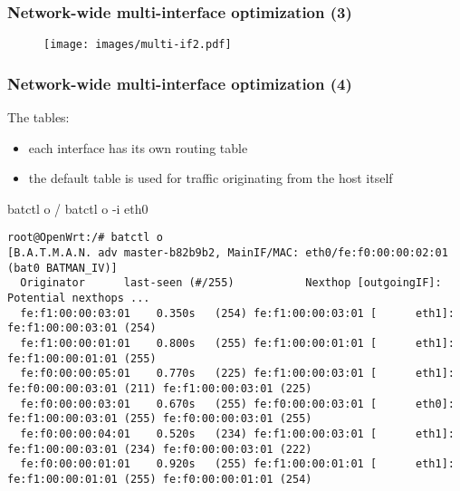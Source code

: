 \documentclass[slidestop]{beamer}
\begin{document}
\begin{frame}[c]
	\frametitle{Network-wide multi-interface optimization (3)}

	\begin{figure}
		\centering
		\texttt{[image: images/multi-if2.pdf]}
	\end{figure}
\end{frame}

\begin{frame}[c,fragile]
	\frametitle{Network-wide multi-interface optimization (4)}

	The tables:

	\begin{itemize}
		\item each interface has its own routing table
		\item the default table is used for traffic originating from the host itself
	\end{itemize}

	batctl o / batctl o -i eth0
	\begin{lstlisting}[basicstyle=\tiny]
root@OpenWrt:/# batctl o
[B.A.T.M.A.N. adv master-b82b9b2, MainIF/MAC: eth0/fe:f0:00:00:02:01 (bat0 BATMAN_IV)]
  Originator      last-seen (#/255)           Nexthop [outgoingIF]:   Potential nexthops ...
  fe:f1:00:00:03:01    0.350s   (254) fe:f1:00:00:03:01 [      eth1]: fe:f1:00:00:03:01 (254)
  fe:f1:00:00:01:01    0.800s   (255) fe:f1:00:00:01:01 [      eth1]: fe:f1:00:00:01:01 (255)
  fe:f0:00:00:05:01    0.770s   (225) fe:f1:00:00:03:01 [      eth1]: fe:f0:00:00:03:01 (211) fe:f1:00:00:03:01 (225)
  fe:f0:00:00:03:01    0.670s   (255) fe:f0:00:00:03:01 [      eth0]: fe:f1:00:00:03:01 (255) fe:f0:00:00:03:01 (255)
  fe:f0:00:00:04:01    0.520s   (234) fe:f1:00:00:03:01 [      eth1]: fe:f1:00:00:03:01 (234) fe:f0:00:00:03:01 (222)
  fe:f0:00:00:01:01    0.920s   (255) fe:f1:00:00:01:01 [      eth1]: fe:f1:00:00:01:01 (255) fe:f0:00:00:01:01 (254)


\end{lstlisting}
\end{frame}
\end{document}
